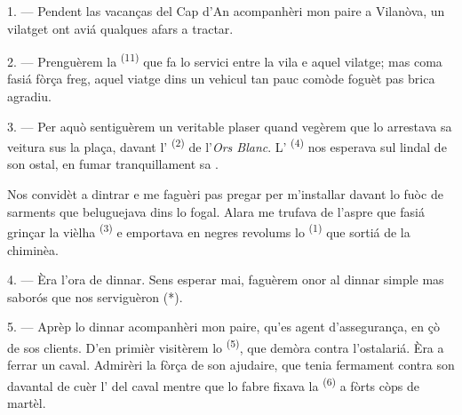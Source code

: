 

\VUsaut{4.0mm}
\VUsaut{3.0mm}
\VUfilet{16mm}
\VUsaut{5.6mm}
\VUsaut{3.0mm}

\VUsaut{3.0mm}

\VUsaut{4.0mm}

1. --- Pendent las vacanças del Cap d'An acompanhèri mon paire a Vilanòva, un
vilatget ont aviá qualques afars a tractar.

2. --- Prenguèrem la  \textsuperscript{(11)} que fa lo servici
entre la vila e aquel vilatge; mas coma fasiá fòrça freg, aquel viatge dins un
vehicul tan pauc comòde foguèt pas brica agradiu.

3. --- Per aquò sentiguèrem un veritable plaser quand vegèrem que lo
 arrestava sa veitura sus la plaça, davant l'
\textsuperscript{(2)} de l'\textit{Ors Blanc}. L'
\textsuperscript{(4)} nos esperava sul lindal de son ostal, en fumar
tranquillament sa .

Nos convidèt a dintrar e me faguèri pas pregar per m'installar davant lo fuòc de
sarments que beluguejava dins lo fogal. Alara me trufava de l'aspre  que fasiá grinçar la vièlha  \textsuperscript{(3)} e
emportava en negres revolums lo  \textsuperscript{(1)} que sortiá de
la chiminèa.

4. --- Èra l'ora de dinnar. Sens esperar mai, faguèrem onor al dinnar simple mas
saborós que nos serviguèron (*).

\VUsaut{3.0mm}

5. --- Aprèp lo dinnar acompanhèri mon paire, qu'es agent d'assegurança, en çò de
sos clients. D'en primièr visitèrem lo  \textsuperscript{(5)}, que
demòra contra l'ostalariá. Èra a ferrar un caval. Admirèri la fòrça de son
ajudaire, que tenia fermament contra son davantal de cuèr l' del
caval mentre que lo fabre fixava la  \textsuperscript{(6)} a
fòrts còps de martèl.

